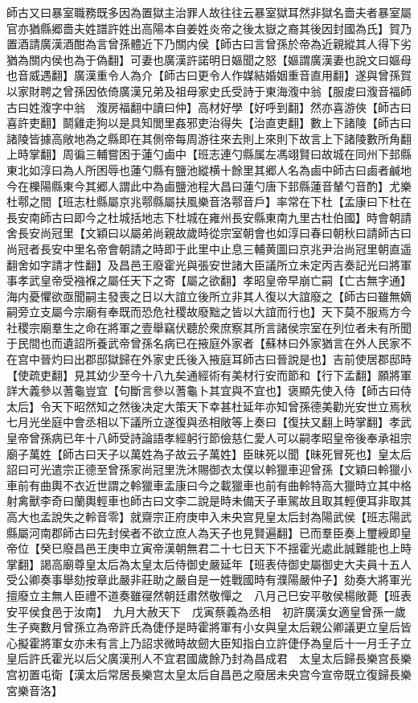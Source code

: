 師古又曰暴室職務既多因為置獄主治罪人故往往云暴室獄耳然非獄名嗇夫者暴室屬官亦猶縣郷嗇夫姓譜許姓出高陽本自姜姓炎帝之後太嶽之裔其後因封國為氏】賀乃置酒請廣漢酒酣為言曾孫體近下乃關内侯【師古曰言曾孫於帝為近親縱其人得下劣猶為關内侯也為于偽翻】可妻也廣漢許諾明日嫗聞之怒【嫗謂廣漢妻也說文曰嫗母也音威遇翻】廣漢重令人為介【師古曰更令人作媒結婚姻重音直用翻】遂與曾孫賀以家財聘之曾孫因依倚廣漢兄弟及祖母家史氏受詩于東海澓中翁【服䖍曰澓音福師古曰姓澓字中翁　澓房福翻中讀曰仲】高材好學【好呼到翻】然亦喜游俠【師古曰喜許吏翻】鬬雞走狗以是具知閭里姦邪吏治得失【治直吏翻】數上下諸陵【師古曰諸陵皆據高敞地為之縣即在其側帝每周游往來去則上來則下故言上下諸陵數所角翻上時掌翻】周徧三輔嘗困于蓮勺鹵中【班志連勺縣属左馮翊賢曰故城在同州下邽縣東北如淳曰為人所困辱也蓮勺縣有鹽池縱横十餘里其郷人名為鹵中師古曰鹵者鹹地今在櫟陽縣東今其郷人謂此中為鹵鹽池程大昌曰蓮勺唐下邽縣蓮音輦勺音酌】尤樂杜鄠之間【班志杜縣屬京兆鄠縣屬扶風樂音洛鄠音戶】率常在下杜【孟康曰下杜在長安南師古曰即今之杜城括地志下杜城在雍州長安縣東南九里古杜伯國】時會朝請舍長安尚冠里【文穎曰以屬弟尚親故歲時從宗室朝會也如淳曰春曰朝秋曰請師古曰尚冠者長安中里名帝會朝請之時即于此里中止息三輔黄圖曰京兆尹治尚冠里朝直遥翻舍如字請才性翻】及昌邑王廢霍光與張安世諸大臣議所立未定丙吉奏記光曰將軍事孝武皇帝受襁褓之屬任天下之寄【屬之欲翻】孝昭皇帝早崩亡嗣【亡古無字通】海内憂懼欲亟聞嗣主發喪之日以大誼立後所立非其人復以大誼廢之【師古曰雖無嫡嗣旁立支屬今宗廟有奉既而恐危社稷故廢黜之皆以大誼而行也】天下莫不服焉方今社稷宗廟羣生之命在將軍之壹舉竊伏聽於衆庶察其所言諸侯宗室在列位者未有所聞于民間也而遺詔所養武帝曾孫名病已在掖庭外家者【蘇林曰外家猶言在外人民家不在宫中晉灼曰出郡邸獄歸在外家史氏後入掖庭耳師古曰晉說是也】吉前使居郡邸時【使疏吏翻】見其幼少至今十八九矣通經術有美材行安而節和【行下孟翻】願將軍詳大義參以蓍龜豈宜【句斷言參以蓍龜卜其宜與不宜也】褒顯先使入侍【師古曰侍太后】令天下昭然知之然後决定大策天下幸甚杜延年亦知曾孫德美勸光安世立焉秋七月光坐庭中會丞相以下議所立遂復與丞相敞等上奏曰【復扶又翻上時掌翻】孝武皇帝曾孫病已年十八師受詩論語孝經躬行節儉慈仁愛人可以嗣孝昭皇帝後奉承祖宗廟子萬姓【師古曰天子以萬姓為子故云子萬姓】臣昧死以聞【昧死冒死也】皇太后詔曰可光遣宗正德至曾孫家尚冠里洗沐賜御衣太僕以軨獵車迎曾孫【文穎曰軨獵小車前有曲輿不衣近世謂之軨獵車孟康曰今之載獵車也前有曲軨特高大獵時立其中格射禽獸李奇曰蘭輿輕車也師古曰文李二說是時未備天子車駕故且取其輕便耳非取其高大也孟說失之軨音零】就齋宗正府庚申入未央宫見皇太后封為陽武侯【班志陽武縣屬河南郡師古曰先封侯者不欲立庶人為天子也見賢遍翻】已而羣臣奏上璽綬即皇帝位【癸巳廢昌邑王庚申立寅帝漢朝無君二十七日天下不揺霍光處此誠難能也上時掌翻】謁高廟尊皇太后為太皇太后侍御史嚴延年【班表侍御史屬御史大夫員十五人受公卿奏事舉劾按章此嚴非莊助之嚴自是一姓戰國時有濮陽嚴仲子】劾奏大將軍光擅廢立主無人臣禮不道奏雖寑然朝廷肅然敬憚之　八月己巳安平敬侯楊敞薨【班表安平侯食邑于汝南】　九月大赦天下　戊寅蔡義為丞相　初許廣漢女適皇曾孫一歲生子奭數月曾孫立為帝許氏為倢伃是時霍將軍有小女與皇太后親公卿議更立皇后皆心擬霍將軍女亦未有言上乃詔求微時故劒大臣知指白立許倢伃為皇后十一月壬子立皇后許氏霍光以后父廣漢刑人不宜君國歲餘乃封為昌成君　太皇太后歸長樂宫長樂宫初置屯衛【漢太后常居長樂宫太皇太后自昌邑之廢居未央宫今宣帝既立復歸長樂宮樂音洛】

